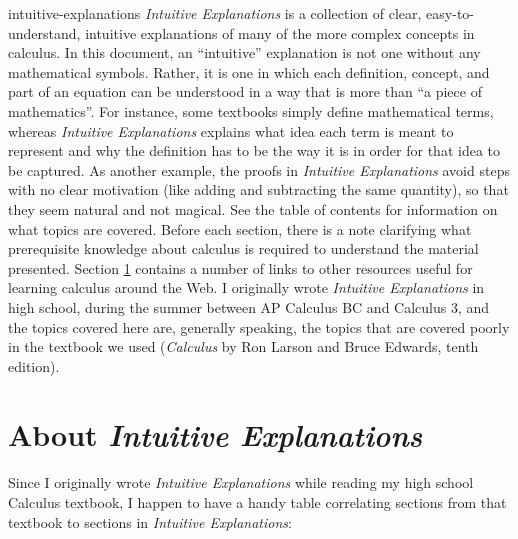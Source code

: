 \documentclass{myarticle}
\theoremstyle{nospace}
\newtheorem{old series theorem}{Theorem}
\newenvironment{series theorem}
{\begin{mdframed}\begin{old series theorem}}
    {\end{old series theorem}\end{mdframed}}
\begin{document}
 {intuitive-explanations}
{\textit{Intuitive Explanations} is a collection of clear,
  easy-to-understand, intuitive explanations of many of the more
  complex concepts in calculus. In this document, an ``intuitive''
  explanation is not one without any mathematical symbols. Rather, it
  is one in which each definition, concept, and part of an equation
  can be understood in a way that is more than ``a piece of
  mathematics''. For instance, some textbooks simply define
  mathematical terms, whereas \textit{Intuitive Explanations} explains
  what idea each term is meant to represent and why the definition has
  to be the way it is in order for that idea to be captured. As
  another example, the proofs in \textit{Intuitive Explanations} avoid
  steps with no clear motivation (like adding and subtracting the same
  quantity), so that they seem natural and not magical. See the table
  of contents for information on what topics are covered. Before each
  section, there is a note clarifying what prerequisite knowledge
  about calculus is required to understand the material presented.
  Section \ref{sec:about} contains a number of links to other
  resources useful for learning calculus around the Web. I originally
  wrote \textit{Intuitive Explanations} in high school, during the
  summer between AP Calculus BC and Calculus 3, and the topics covered
  here are, generally speaking, the topics that are covered poorly in
  the textbook we used (\textit{Calculus} by Ron Larson and Bruce
  Edwards, tenth edition).}

\tableofcontents
\clearpage

\section{About \textit{Intuitive Explanations}}
\label{sec:about}

Since I originally wrote \textit{Intuitive Explanations} while reading
my high school Calculus textbook, I happen to have a handy table
correlating sections from that textbook to sections in
\textit{Intuitive Explanations}:
\end{document}
